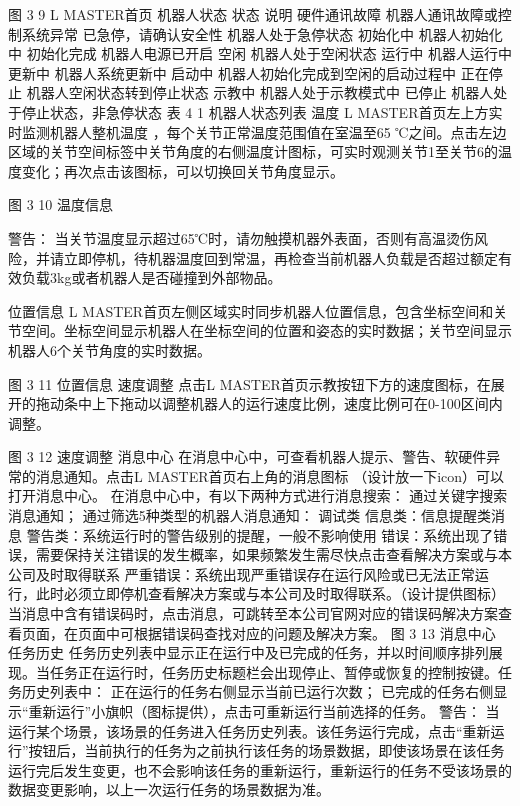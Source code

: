 图 3 9 L MASTER首页
机器人状态
状态	说明
硬件通讯故障	机器人通讯故障或控制系统异常
已急停，请确认安全性	机器人处于急停状态
初始化中	机器人初始化中
初始化完成	机器人电源已开启
空闲	机器人处于空闲状态
运行中	机器人运行中
更新中	机器人系统更新中
启动中	机器人初始化完成到空闲的启动过程中
正在停止	机器人空闲状态转到停止状态
示教中	机器人处于示教模式中
已停止	机器人处于停止状态，非急停状态
表 4 1 机器人状态列表
温度
L MASTER首页左上方实时监测机器人整机温度 ，每个关节正常温度范围值在室温至65 ℃之间。点击左边区域的关节空间标签中关节角度的右侧温度计图标，可实时观测关节1至关节6的温度变化；再次点击该图标，可以切换回关节角度显示。
 
图 3 10 温度信息

 	警告：
当关节温度显示超过65℃时，请勿触摸机器外表面，否则有高温烫伤风险，并请立即停机，待机器温度回到常温，再检查当前机器人负载是否超过额定有效负载3kg或者机器人是否碰撞到外部物品。

位置信息 
L MASTER首页左侧区域实时同步机器人位置信息，包含坐标空间和关节空间。坐标空间显示机器人在坐标空间的位置和姿态的实时数据；关节空间显示机器人6个关节角度的实时数据。
 
图 3 11 位置信息
速度调整
点击L MASTER首页示教按钮下方的速度图标，在展开的拖动条中上下拖动以调整机器人的运行速度比例，速度比例可在0-100区间内调整。
 
图 3 12 速度调整
消息中心
在消息中心中，可查看机器人提示、警告、软硬件异常的消息通知。点击L MASTER首页右上角的消息图标 （设计放一下icon）可以打开消息中心。
在消息中心中，有以下两种方式进行消息搜索：
通过关键字搜索消息通知；
通过筛选5种类型的机器人消息通知：
调试类
信息类：信息提醒类消息
警告类：系统运行时的警告级别的提醒，一般不影响使用
错误：系统出现了错误，需要保持关注错误的发生概率，如果频繁发生需尽快点击查看解决方案或与本公司及时取得联系 
严重错误：系统出现严重错误存在运行风险或已无法正常运行，此时必须立即停机查看解决方案或与本公司及时取得联系。（设计提供图标）
当消息中含有错误码时，点击消息，可跳转至本公司官网对应的错误码解决方案查看页面，在页面中可根据错误码查找对应的问题及解决方案。 
图 3 13 消息中心
任务历史
任务历史列表中显示正在运行中及已完成的任务，并以时间顺序排列展现。当任务正在运行时，任务历史标题栏会出现停止、暂停或恢复的控制按键。任务历史列表中：
正在运行的任务右侧显示当前已运行次数；
已完成的任务右侧显示“重新运行”小旗帜（图标提供），点击可重新运行当前选择的任务。
 	警告：
当运行某个场景，该场景的任务进入任务历史列表。该任务运行完成，点击“重新运行”按钮后，当前执行的任务为之前执行该任务的场景数据，即使该场景在该任务运行完后发生变更，也不会影响该任务的重新运行，重新运行的任务不受该场景的数据变更影响，以上一次运行任务的场景数据为准。

